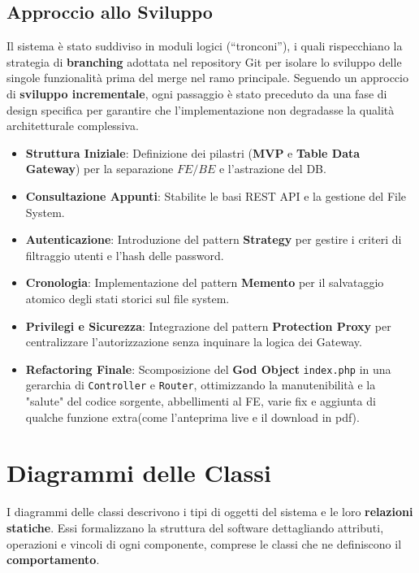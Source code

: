 \subsection{Approccio allo Sviluppo}

\noindent Il sistema è stato suddiviso in moduli logici (``tronconi''), i quali rispecchiano la strategia di \textbf{branching} adottata nel repository Git per isolare lo sviluppo delle singole funzionalità prima del merge nel ramo principale. Seguendo un approccio di \textbf{sviluppo incrementale}, ogni passaggio è stato preceduto da una fase di design specifica per garantire che l'implementazione non degradasse la qualità architetturale complessiva.

\begin{itemize}
    \item \textbf{Struttura Iniziale}: Definizione dei pilastri (\textbf{MVP} e \textbf{Table Data Gateway}) per la separazione $FE/BE$ e l'astrazione del DB.
    \item \textbf{Consultazione Appunti}: Stabilite le basi REST API e la gestione del File System.
    \item \textbf{Autenticazione}: Introduzione del pattern \textbf{Strategy} per gestire i criteri di filtraggio utenti e l'hash delle password.
    \item \textbf{Cronologia}: Implementazione del pattern \textbf{Memento} per il salvataggio atomico degli stati storici sul file system.
    \item \textbf{Privilegi e Sicurezza}: Integrazione del pattern \textbf{Protection Proxy} per centralizzare l'autorizzazione senza inquinare la logica dei Gateway.
    \item \textbf{Refactoring Finale}: Scomposizione del \textbf{God Object} \texttt{index.php} in una gerarchia di \texttt{Controller} e \texttt{Router}, ottimizzando la manutenibilità e la "salute" del codice sorgente, abbellimenti al FE, varie fix e aggiunta di qualche funzione extra(come l'anteprima live e il download in pdf).
\end{itemize}

\section{Diagrammi delle Classi}

\noindent I diagrammi delle classi descrivono i tipi di oggetti del sistema e le loro \textbf{relazioni statiche}. Essi formalizzano la struttura del software dettagliando attributi, operazioni e vincoli di ogni componente, comprese le classi che ne definiscono il \textbf{comportamento}.


